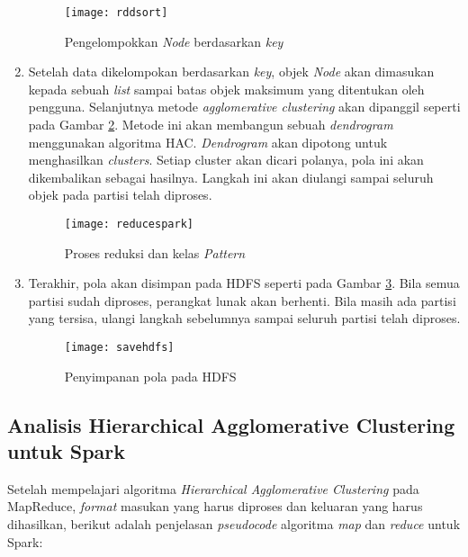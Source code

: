 \begin{enumerate}
\begin{figure}[H]
    \centering  
    \texttt{[image: rddsort]}  
    \caption[Pengelompokkan \textit{Node} berdasarkan \textit{key}]{Pengelompokkan \textit{Node} berdasarkan \textit{key}} 
    \label{fig:rddsort} 
\end{figure}

\item Setelah data dikelompokan berdasarkan \textit{key}, objek \textit{Node} akan dimasukan kepada sebuah \textit{list} sampai batas objek maksimum yang ditentukan oleh pengguna. Selanjutnya metode \textit{agglomerative clustering} akan dipanggil seperti pada Gambar \ref{fig:reducespark}. Metode ini akan membangun sebuah \textit{dendrogram} menggunakan algoritma HAC. \textit{Dendrogram} akan dipotong untuk menghasilkan \textit{clusters}. Setiap cluster akan dicari polanya, pola ini akan dikembalikan sebagai hasilnya. Langkah ini akan diulangi sampai seluruh objek pada partisi telah diproses.

\begin{figure}[H]
    \centering  
    \texttt{[image: reducespark]}  
    \caption[Proses reduksi dan kelas \textit{Pattern}]{Proses reduksi dan kelas \textit{Pattern}} 
    \label{fig:reducespark} 
\end{figure}


\item Terakhir, pola akan disimpan pada HDFS seperti pada Gambar \ref{fig:savehdfs}. Bila semua partisi sudah diproses, perangkat lunak akan berhenti. Bila masih ada partisi yang tersisa, ulangi langkah sebelumnya sampai seluruh partisi telah diproses.

\begin{figure}[H]
    \centering  
    \texttt{[image: savehdfs]}  
    \caption[Penyimpanan pola pada HDFS]{Penyimpanan pola pada HDFS} 
    \label{fig:savehdfs} 
\end{figure}

\end{enumerate}

\subsection{Analisis Hierarchical Agglomerative Clustering untuk Spark}

Setelah mempelajari algoritma \textit{Hierarchical Agglomerative Clustering} pada MapReduce, \textit{format} masukan yang harus diproses dan keluaran yang harus dihasilkan, berikut adalah penjelasan \textit{pseudocode} algoritma \textit{map} dan \textit{reduce} untuk Spark:\\

